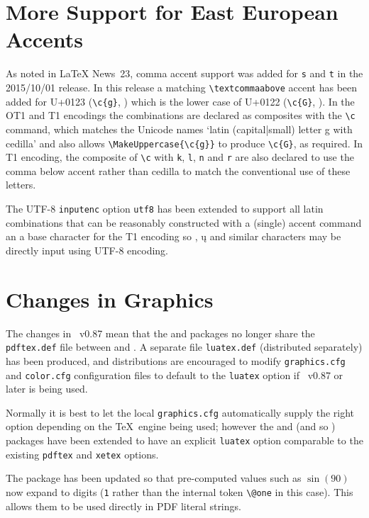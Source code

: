 \documentclass{ltnews}
\begin{document}
\section{More Support for East European Accents}

As noted in \LaTeX{} News~23, comma accent support was added for \texttt{s} and
\texttt{t} in the 2015/10/01 release. In this release a matching
\verb|\textcommaabove| accent has been added for U+0123 (\verb|\c{g}|,
) which is the lower case of U+0122 (\verb|\c{G}|,
).  In the OT1 and T1 encodings the combinations are
declared as composites with the \verb|\c| command, which matches the
Unicode names `\textsf{latin (capital|small) letter g with cedilla}' and
also allows \verb|\MakeUppercase{\c{g}}| to produce \verb|\c{G}|, as
required.  In T1 encoding, the composite of \verb|\c| with \texttt{k}, \texttt{l},
\texttt{n} and \texttt{r} are also
declared to use the comma below accent rather than cedilla to match the
conventional use of these letters.

The UTF-8 \texttt{inputenc} option \texttt{utf8} has been extended to
support all latin combinations that can be reasonably constructed with a
(single) accent command an a base character for the T1 encoding so
, \k{u} and similar characters may be directly input
using UTF-8 encoding.

\section{Changes in Graphics}
The changes in ~v0.87 mean that the  and
 packages no longer share the \texttt{pdftex.def} file
between  and . A separate file
\texttt{luatex.def} (distributed separately) has been produced, and
distributions are encouraged to modify \texttt{graphics.cfg} and
\texttt{color.cfg} configuration files to default to the \texttt{luatex}
option if ~v0.87 or later is being used.

Normally it is best to let the local \texttt{graphics.cfg}
automatically supply the right option depending on the \TeX\ engine
being used; however the  and  (and so
) packages have been extended to have an explicit
\texttt{luatex} option comparable to the existing \texttt{pdftex} and
\texttt{xetex} options.

The  package has been updated so that pre-computed values
such as $\sin(90)$ now expand to digits (\texttt{1} rather than the
internal token \verb|\@one| in this case). This allows them to be used
directly in PDF literal strings. 
\end{document}
